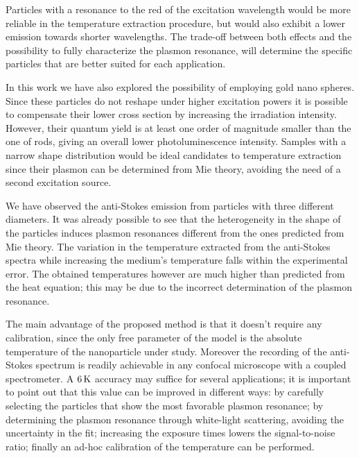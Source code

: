 Particles with a resonance to the red of the excitation wavelength would be more
reliable in the temperature extraction procedure, but would also exhibit a lower
emission towards shorter wavelengths. The trade-off between both effects and
the possibility to fully characterize the plasmon resonance, will determine the
specific particles that are better suited for each application.

In this work we have also explored the possibility of employing gold nano
spheres. Since these particles do not reshape under higher excitation powers it
is possible to compensate their lower cross section by increasing the
irradiation intensity. However, their quantum yield is at least one order of
magnitude smaller than the one of rods, giving an overall lower
photoluminescence intensity. Samples with a narrow shape distribution
would be ideal candidates to temperature extraction since their plasmon can be
determined from Mie theory, avoiding the need of a second excitation source.

We have observed the anti-Stokes emission from particles with three different
diameters. It was already possible to see that the heterogeneity in the
shape of the particles induces plasmon resonances different from the ones
predicted from Mie theory. The variation in the temperature extracted from the
anti-Stokes spectra while increasing the medium's temperature falls within the
experimental error. The obtained temperatures however are much higher than
predicted from the heat equation; this may be due to the incorrect determination
of the plasmon resonance.

The main advantage of the proposed method is that it doesn't require any
calibration, since the only free parameter of the model is the absolute
temperature of the nanoparticle under study. Moreover the recording of the
anti-Stokes spectrum is readily achievable in any confocal microscope with a
coupled spectrometer. A $6\,\textrm{K}$ accuracy may suffice for several applications; it
is important to point out that this value can be improved in different ways: by
carefully selecting the particles that show the most favorable plasmon
resonance; by determining the plasmon resonance through white-light scattering,
avoiding the uncertainty in the fit; increasing the exposure times lowers the
signal-to-noise ratio; finally an ad-hoc calibration of the temperature can
be performed.


